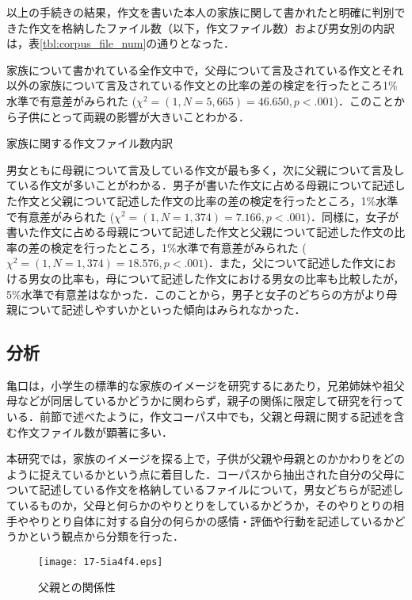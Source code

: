 \documentclass[japanese]{jnlp_1.4}
\begin{document}
以上の手続きの結果，作文を書いた本人の家族に関して書かれたと明確に判別できた作文を格納したファイル数（以下，作文ファイル数）および男女別の内訳は，表\ref{tbl:corpus_file_num}の通りとなった．

家族について書かれている全作文中で，父母について言及されている作文とそれ以外の家族について言及されている作文との比率の差の検定を行ったところ1\%水準で有意差がみられた ($ \chi^2 = (1, N=5,665) = 46.650, p<.001 $)．このことから子供にとって両親の影響が大きいことわかる．

\begin{table}[t]
\caption{家族に関する作文ファイル数内訳}
\label{tbl:corpus_file_num}

\end{table}

男女ともに母親について言及している作文が最も多く，次に父親について言及している作文が多いことがわかる．男子が書いた作文に占める母親について記述した作文と父親について記述した作文の比率の差の検定を行ったところ，1\%水準で有意差がみられた ($ \chi^2 = (1, N=1,374) = 7.166, p<.001 $)．同様に，女子が書いた作文に占める母親について記述した作文と父親について記述した作文の比率の差の検定を行ったところ，1\%水準で有意差がみられた ($ \chi^2 = (1, N=1,374) = 18.576, p<.001 $)．また，父について記述した作文における男女の比率も，母について記述した作文における男女の比率も比較したが，5\%水準で有意差はなかった．このことから，男子と女子のどちらの方がより母親について記述しやすいかといった傾向はみられなかった．


\subsection{分析}

亀口\cite{Bk_Kam}は，小学生の標準的な家族のイメージを研究するにあたり，兄弟姉妹や祖父母などが同居しているかどうかに関わらず，親子の関係に限定して研究を行っている．前節で述べたように，作文コーパス中でも，父親と母親に関する記述を含む作文ファイル数が顕著に多い．

本研究では，家族のイメージを探る上で，子供が父親や母親とのかかわりをどのように捉えているかという点に着目した．コーパスから抽出された自分の父母について記述している作文を格納しているファイルについて，男女どちらが記述しているものか，父母と何らかのやりとりをしているかどうか，そのやりとりの相手ややりとり自体に対する自分の何らかの感情・評価や行動を記述しているかどうかという観点から分類を行った．

\begin{figure}[b]
\begin{center}
\texttt{[image: 17-5ia4f4.eps]}
\caption{父親との関係性}
\label{fig:rel_father}
\end{center}
\end{figure}
\end{document}
